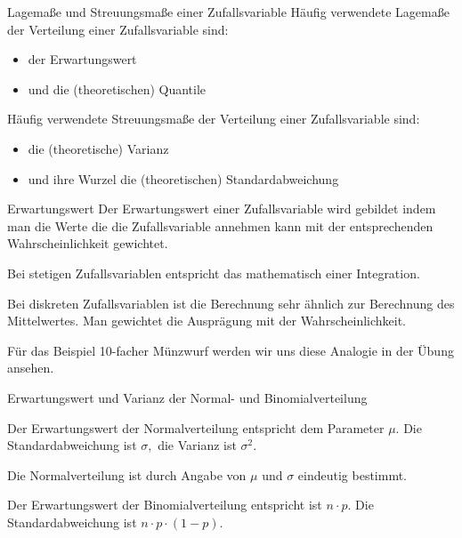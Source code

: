 \documentclass[usenames,dvipsnames,handout]{beamer}
\begin{document}
\begin{frame}{Lagemaße und Streuungsmaße einer Zufallsvariable}
Häufig verwendete  Lagemaße der Verteilung einer Zufallsvariable sind:
\begin{itemize}
\item{der Erwartungswert}
\item{und die (theoretischen) Quantile}
\end{itemize}
Häufig verwendete Streuungsmaße der Verteilung einer Zufallsvariable sind:
\begin{itemize}
\item{die (theoretische) Varianz}
\item{und ihre Wurzel die (theoretischen) Standardabweichung}
\end{itemize}
\end{frame}

\begin{frame}{Erwartungswert}
Der Erwartungswert einer Zufallsvariable wird gebildet indem man die Werte die die Zufallsvariable annehmen kann mit der entsprechenden
Wahrscheinlichkeit gewichtet.
\begin{description}
\item{Bei stetigen Zufallsvariablen entspricht das mathematisch einer Integration.}\pause
\item{Bei diskreten Zufallsvariablen ist die Berechnung sehr ähnlich zur Berechnung des Mittelwertes. Man gewichtet die Ausprägung mit der Wahrscheinlichkeit.}\pause
\item{Für das Beispiel 10-facher Münzwurf werden wir uns diese Analogie in der Übung ansehen.}
\end{description}
\end{frame}

\begin{frame}{Erwartungswert und Varianz der Normal- und Binomialverteilung}
\begin{description}
\item{Der Erwartungswert der Normalverteilung entspricht dem Parameter $\mu.$ Die Standardabweichung ist $\sigma,$
die Varianz ist $\sigma^{2}.$}
\item{Die Normalverteilung ist durch Angabe von $\mu$ und $\sigma$ eindeutig bestimmt.}
\item{Der Erwartungswert der Binomialverteilung entspricht ist $n \cdot p.$ Die Standardabweichung ist $n \cdot p \cdot (1-p).$
}
\end{description}
\end{frame}
\end{document}
